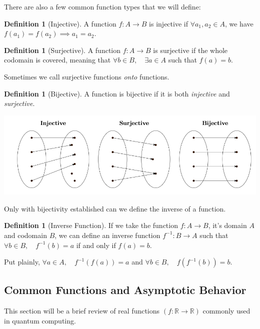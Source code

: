 \documentclass[12pt]{article}
\theoremstyle{definition}
\newtheorem{definition}[theorem]{Definition}
\begin{document}
There are also a few common function types that we will define:

\begin{definition}[Injective]
    A function $f: A \rightarrow B$ is injective if $\forall a_1, a_2 \in A$, we have $f(a_1) = f(a_2) \implies a_1 = a_2$.
\end{definition}


\begin{definition}[Surjective]
    A function $f: A \rightarrow B$ is surjective if the whole codomain is covered, meaning that $\forall b \in B, \quad \exists a \in A$ such that $f(a) = b$.
\end{definition}

Sometimes we call surjective functions \emph{onto} functions.

\begin{definition}[Bijective]
    A function is bijective if it is both \emph{injective} and \emph{surjective}.
\end{definition}


\includegraphics[width=\textwidth]{4_func1}


Only with bijectivity established can we define the inverse of a function.

\begin{definition}[Inverse Function]
    If we take the function $f: A \rightarrow B$, it's domain $A$ and codomain $B$, we can define an inverse function $f^{-1}: B \rightarrow A$ such that $\forall b \in B, \quad f^{-1}(b) = a$ if and only if $f(a) = b$. 
\end{definition}
 
Put plainly, $\forall a \in A, \quad f^{-1}(f(a)) = a$ and $\forall b \in B, \quad f(f^{-1}(b)) = b$.


\subsection{Common Functions and Asymptotic Behavior}

This section will be a brief review of real functions $(f: \mathbb{R} \rightarrow \mathbb{R})$ commonly used in quantum computing. 
\end{document}
